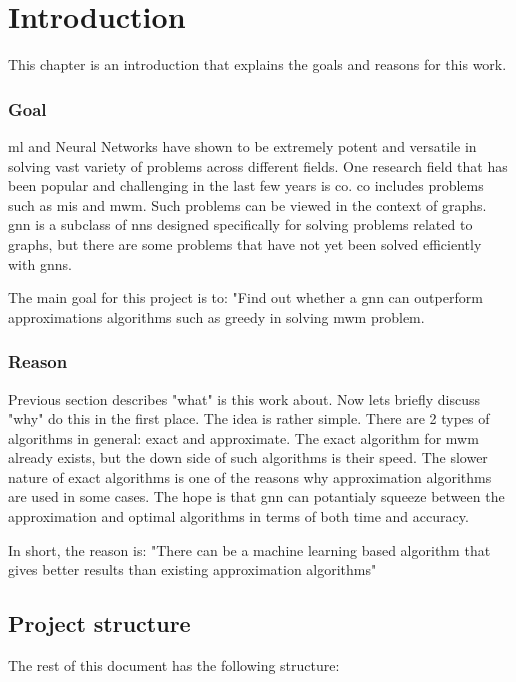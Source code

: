 \chapter{Introduction}

This chapter is an introduction that explains the goals and reasons for this work.

\subsection{Goal}

\gls{ml} and Neural Networks have shown to be extremely potent and versatile in solving vast variety of problems across different fields. One research field that has been popular and challenging in the last few years is \gls{co}. \gls{co} includes problems such as \gls{mis} and \gls{mwm}. Such problems can be viewed in the context of graphs. \gls{gnn} is a subclass of \gls{nn}s designed specifically for solving problems related to graphs, but there are some problems that have not yet been solved efficiently with \gls{gnn}s. 

The main goal for this project is to: "Find out whether a \gls{gnn} can outperform approximations algorithms such as greedy in solving \gls{mwm} problem. 

\subsection{Reason}

Previous section describes "what" is this work about. Now lets briefly discuss "why" do this in the first place. The idea is rather simple. There are 2 types of algorithms in general: exact and approximate. The exact algorithm for \gls{mwm} already exists, but the down side of such algorithms is their speed. The slower nature of exact algorithms is one of the reasons why approximation algorithms are used in some cases. The hope is that  \gls{gnn} can potantialy squeeze between the approximation and optimal algorithms in terms of both time and accuracy.

In short, the reason is: "There can be a machine learning based algorithm that gives better results than existing approximation algorithms"

\section{Project structure}

The rest of this document has the following structure:

